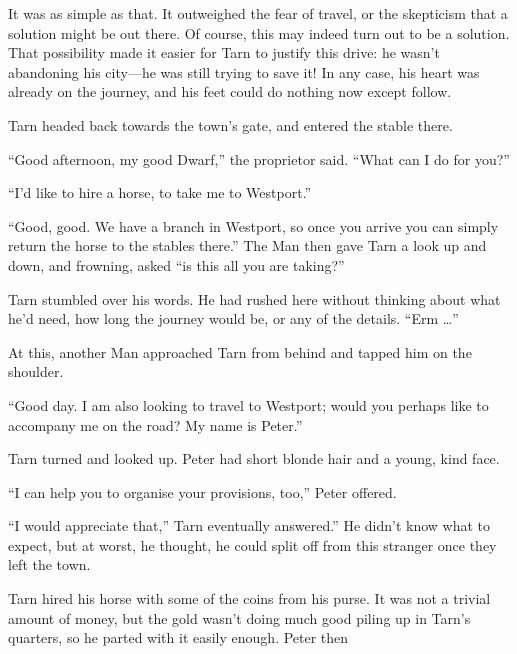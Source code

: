 It was as simple as that.  It outweighed the fear of travel, or the skepticism that a solution might be out there.  Of course, this may indeed turn out to be a solution.  That possibility made it easier for Tarn to justify this drive: he wasn't abandoning his city---he was still trying to save it!  In any case, his heart was already on the journey, and his feet could do nothing now except follow.

Tarn headed back towards the town's gate, and entered the stable there.

``Good afternoon, my good Dwarf,'' the proprietor said.  ``What can I do for you?''

``I'd like to hire a horse, to take me to Westport.''

``Good, good.  We have a branch in Westport, so once you arrive you can simply return the horse to the stables there.''  The Man then gave Tarn a look up and down, and frowning, asked ``is this all you are taking?''

Tarn stumbled over his words.  He had rushed here without thinking about what he'd need, how long the journey would be, or any of the details.  ``Erm \ldots{}''

At this, another Man approached Tarn from behind and tapped him on the shoulder.

``Good day.  I am also looking to travel to Westport; would you perhaps like to accompany me on the road?  My name is Peter.''

Tarn turned and looked up.  Peter had short blonde hair and a young, kind face.

``I can help you to organise your provisions, too,'' Peter offered.

``I would appreciate that,'' Tarn eventually answered.''  He didn't know what to expect, but at worst, he thought, he could split off from this stranger once they left the town.

Tarn hired his horse with some of the coins from his purse.  It was not a trivial amount of money, but the gold wasn't doing much good piling up in Tarn's quarters, so he parted with it easily enough.  Peter then 